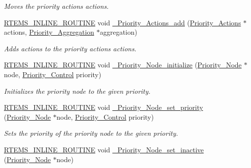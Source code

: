 \begin{DoxyCompactItemize}
\begin{DoxyCompactList}\small\item\em Moves the priority actions\textquotesingle{} actions. \end{DoxyCompactList}\item 
\mbox{\hyperlink{group__RTEMSScoreBaseDefs_gac216239df231d5dbd15e3520b0b9313f}{R\+T\+E\+M\+S\+\_\+\+I\+N\+L\+I\+N\+E\+\_\+\+R\+O\+U\+T\+I\+NE}} void \mbox{\hyperlink{group__RTEMSScorePriority_ga62c96ae193f0f06dd79cbb72976e0384}{\+\_\+\+Priority\+\_\+\+Actions\+\_\+add}} (\mbox{\hyperlink{structPriority__Actions}{Priority\+\_\+\+Actions}} $\ast$actions, \mbox{\hyperlink{structPriority__Aggregation}{Priority\+\_\+\+Aggregation}} $\ast$aggregation)
\begin{DoxyCompactList}\small\item\em Adds actions to the priority actions\textquotesingle{} actions. \end{DoxyCompactList}\item 
\mbox{\hyperlink{group__RTEMSScoreBaseDefs_gac216239df231d5dbd15e3520b0b9313f}{R\+T\+E\+M\+S\+\_\+\+I\+N\+L\+I\+N\+E\+\_\+\+R\+O\+U\+T\+I\+NE}} void \mbox{\hyperlink{group__RTEMSScorePriority_ga10c99a53ad7cb8f77e5de8aa06deb934}{\+\_\+\+Priority\+\_\+\+Node\+\_\+initialize}} (\mbox{\hyperlink{structPriority__Node}{Priority\+\_\+\+Node}} $\ast$node, \mbox{\hyperlink{group__RTEMSScorePriority_ga59d02b58072d31a9a1cfe644557aefe2}{Priority\+\_\+\+Control}} priority)
\begin{DoxyCompactList}\small\item\em Initializes the priority node to the given priority. \end{DoxyCompactList}\item 
\mbox{\hyperlink{group__RTEMSScoreBaseDefs_gac216239df231d5dbd15e3520b0b9313f}{R\+T\+E\+M\+S\+\_\+\+I\+N\+L\+I\+N\+E\+\_\+\+R\+O\+U\+T\+I\+NE}} void \mbox{\hyperlink{group__RTEMSScorePriority_ga8f7626eed557998923ac78733f8790c9}{\+\_\+\+Priority\+\_\+\+Node\+\_\+set\+\_\+priority}} (\mbox{\hyperlink{structPriority__Node}{Priority\+\_\+\+Node}} $\ast$node, \mbox{\hyperlink{group__RTEMSScorePriority_ga59d02b58072d31a9a1cfe644557aefe2}{Priority\+\_\+\+Control}} priority)
\begin{DoxyCompactList}\small\item\em Sets the priority of the priority node to the given priority. \end{DoxyCompactList}\item 
\mbox{\hyperlink{group__RTEMSScoreBaseDefs_gac216239df231d5dbd15e3520b0b9313f}{R\+T\+E\+M\+S\+\_\+\+I\+N\+L\+I\+N\+E\+\_\+\+R\+O\+U\+T\+I\+NE}} void \mbox{\hyperlink{group__RTEMSScorePriority_gaae4c7c5c4cc58ddbfd2376615e43d710}{\+\_\+\+Priority\+\_\+\+Node\+\_\+set\+\_\+inactive}} (\mbox{\hyperlink{structPriority__Node}{Priority\+\_\+\+Node}} $\ast$node)

\end{DoxyCompactItemize}
